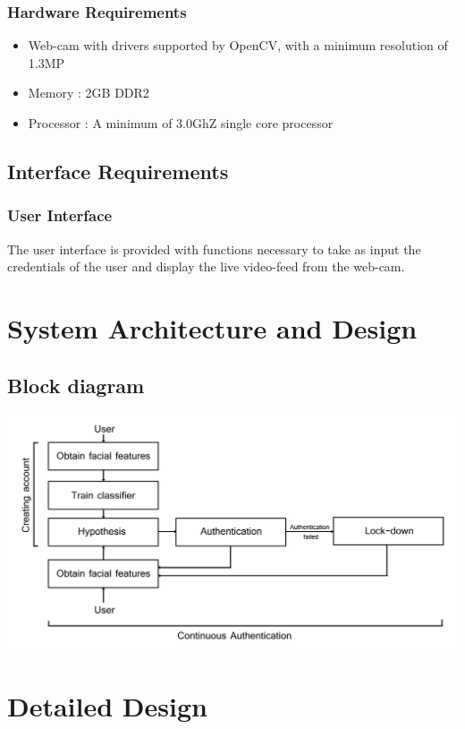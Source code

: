 \documentclass[12pt]{article}			%
\begin{document}
\subsubsection{ Hardware Requirements }
\begin{itemize}
\item Web-cam with drivers supported by OpenCV, with a minimum resolution of 1.3MP
\item Memory : 2GB DDR2
\item Processor : A minimum of 3.0GhZ single core processor
\end{itemize}

\subsection{ Interface Requirements }
\subsubsection{ User Interface }
The user interface is provided with functions necessary to take as input the credentials of the user and display the live video-feed from the web-cam.

\section{ System Architecture and Design }  
\subsection{ Block diagram }
\begin{center}
    \includegraphics[scale=0.8]{block.png}
\end{center}

\section{ Detailed Design }
\end{document}
